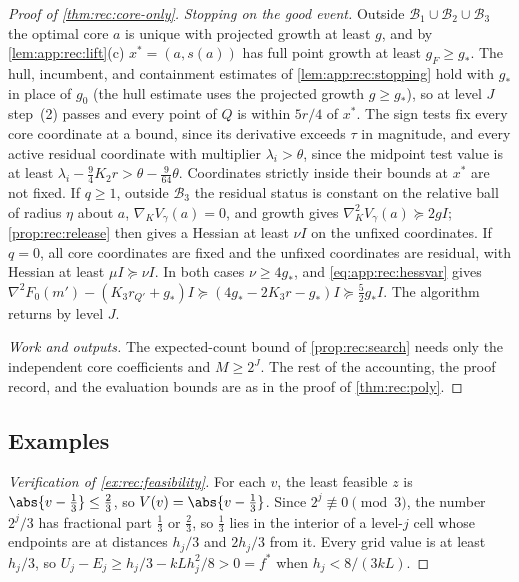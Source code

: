 \begin{proof}[Proof of \cref{thm:rec:core-only}]
\emph{Stopping on the good event.} Outside $\mathcal B_1\cup\mathcal B_2\cup
\mathcal B_3$ the optimal core $a$ is unique with projected growth at least
$g$, and by \cref{lem:app:rec:lift}(c) $x^*=(a,s(a))$ has full point growth at
least $g_F\ge g_*$. The hull, incumbent, and containment estimates of
\cref{lem:app:rec:stopping} hold with $g_*$ in place of $g_0$ (the hull estimate
uses the projected growth $g\ge g_*$), so at level $J$ step~(2) passes and every
point of $Q$ is within $5r/4$ of $x^*$. The sign tests fix every core coordinate
at a bound, since its derivative exceeds $\tau$ in magnitude, and every active
residual coordinate with multiplier $\lambda_i>\theta$, since the midpoint test
value is at least $\lambda_i-\frac94K_2r>\theta-\frac9{64}\theta$. Coordinates
strictly inside their bounds at $x^*$ are not fixed. If $q\ge1$, outside
$\mathcal B_3$ the residual status is constant on the relative ball of radius
$\eta$ about $a$, $\nabla_KV_\gamma(a)=0$, and growth gives
$\nabla^2_KV_\gamma(a)\succeq2gI$; \cref{prop:rec:release} then gives a Hessian at
least $\nu I$ on the unfixed coordinates. If $q=0$, all core coordinates are
fixed and the unfixed coordinates are residual, with Hessian at least $\mu I\succeq
\nu I$. In both cases $\nu\ge4g_*$, and \eqref{eq:app:rec:hessvar} gives
$\nabla^2F_0(m')-(K_3r_{Q'}+g_*)I\succeq(4g_*-2K_3r-g_*)I\succeq\frac52g_*I$.
The algorithm returns by level $J$.

\emph{Work and outputs.} The expected-count bound of \cref{prop:rec:search}
needs only the independent core coefficients and $M\ge2^J$. The rest of the
accounting, the proof record, and the evaluation bounds are as in the proof of
\cref{thm:rec:poly}.
\end{proof}

\subsection{Examples}\label{app:rec:examples}

\begin{proof}[Verification of \cref{ex:rec:feasibility}]
For each $v$, the least feasible $z$ is $\abs{v-\frac13}\le\frac23$, so
$V(v)=\abs{v-\frac13}$. Since $2^j\not\equiv0\pmod3$, the number $2^j/3$ has
fractional part $\frac13$ or $\frac23$, so $\frac13$ lies in the interior of a
level-$j$ cell whose endpoints are at distances $h_j/3$ and $2h_j/3$ from it.
Every grid value is at least $h_j/3$, so $U_j-E_j\ge h_j/3-kLh_j^2/8>0=f^*$ when
$h_j<8/(3kL)$.
\end{proof}

